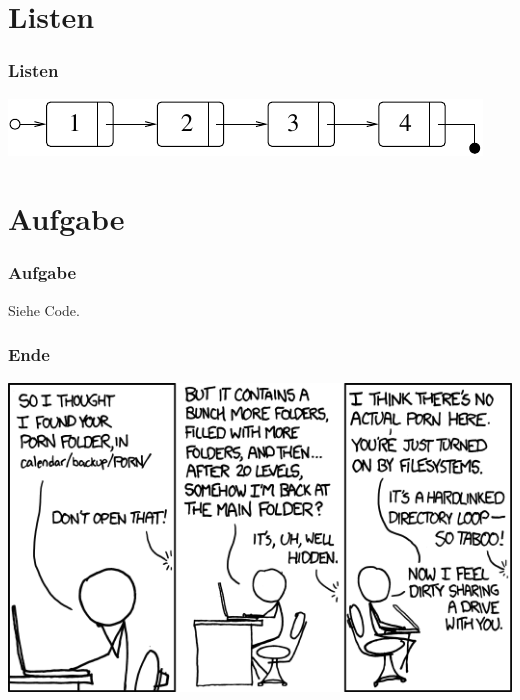 \documentclass{beamer}
\begin{document}
\section{Listen}
\begin{frame}
\frametitle{Listen}
\includegraphics[scale=1.0]{list.pdf}
\end{frame}

\section{Aufgabe}
\begin{frame}[fragile]
\frametitle{Aufgabe}
Siehe Code.
\end{frame}

\begin{frame}
\frametitle{Ende}
\includegraphics[scale=0.4]{porn_folder.png}
\end{frame}
\end{document}
